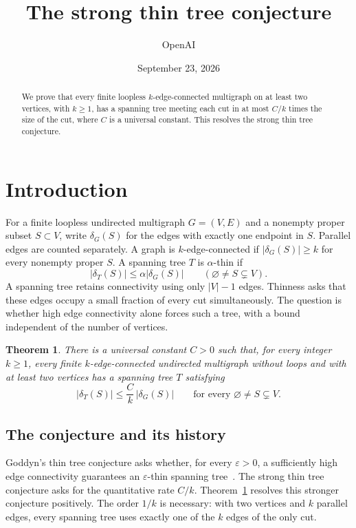 \documentclass[11pt]{amsart}
\title{The strong thin tree conjecture}
\author{OpenAI}
\date{September 23, 2026}
\newtheorem{theorem}{Theorem}[section]
\theoremstyle{definition}
\theoremstyle{remark}
\numberwithin{equation}{section}
\begin{document}
\begin{abstract}
We prove that every finite loopless \(k\)-edge-connected multigraph on
at least two vertices, with \(k\ge1\), has a spanning tree meeting each
cut in at most \(C/k\) times the size of the cut,
where \(C\) is a universal constant.
This resolves the strong thin tree conjecture.
\end{abstract}

\setcounter{tocdepth}{1}
\tableofcontents
\section{Introduction}\label{sec:introduction}

For a finite loopless undirected multigraph \(G=(V,E)\) and a nonempty proper
subset \(S\subset V\), write \(\delta_G(S)\) for the edges with exactly
one endpoint in \(S\). Parallel edges are counted separately.
A graph is \(k\)-edge-connected if \(|\delta_G(S)|\ge k\) for
every nonempty proper \(S\).
A spanning tree \(T\) is \(\alpha\)-thin if
\[
 |\delta_T(S)|\le\alpha|\delta_G(S)|
 \qquad(\varnothing\ne S\subsetneq V).
\]
A spanning tree retains connectivity using only \(|V|-1\) edges.
Thinness asks that these edges occupy a small fraction of every cut
simultaneously. The question is whether high edge connectivity alone
forces such a tree, with a bound independent of the number of vertices.

\begin{theorem}\label{thm:main}
There is a universal constant \(C>0\) such that, for every integer
\(k\ge1\), every finite \(k\)-edge-connected undirected multigraph
without loops and with at least two vertices has a spanning tree \(T\)
satisfying
\[
 |\delta_T(S)|\le\frac Ck\,|\delta_G(S)|
 \qquad\text{for every }\varnothing\ne S\subsetneq V.
\]
\end{theorem}

\subsection*{The conjecture and its history}

Goddyn's thin tree conjecture asks whether, for every
\(\varepsilon>0\), a sufficiently high edge connectivity guarantees
an \(\varepsilon\)-thin spanning tree~\cite{Goddyn}.
The strong thin tree conjecture asks for the quantitative rate \(C/k\).
Theorem~\ref{thm:main} resolves this stronger conjecture positively.
The order \(1/k\) is necessary: with two vertices and \(k\) parallel
edges, every spanning tree uses exactly one of the \(k\) edges of
the only cut.
\end{document}
